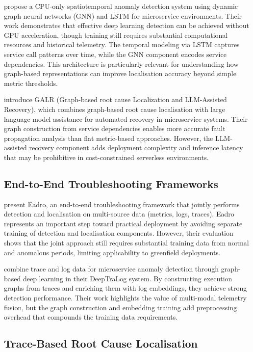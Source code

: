 \citet{zhang2026cpuonly} propose a CPU-only spatiotemporal anomaly detection system using dynamic graph neural networks (GNN) and LSTM for microservice environments. Their work demonstrates that effective deep learning detection can be achieved without GPU acceleration, though training still requires substantial computational resources and historical telemetry. The temporal modeling via LSTM captures service call patterns over time, while the GNN component encodes service dependencies. This architecture is particularly relevant for understanding how graph-based representations can improve localisation accuracy beyond simple metric thresholds.

\citet{zhang2026galr} introduce GALR (Graph-based root cause Localization and LLM-Assisted Recovery), which combines graph-based root cause localisation with large language model assistance for automated recovery in microservice systems. Their graph construction from service dependencies enables more accurate fault propagation analysis than flat metric-based approaches. However, the LLM-assisted recovery component adds deployment complexity and inference latency that may be prohibitive in cost-constrained serverless environments.

\subsection{End-to-End Troubleshooting Frameworks}

\citet{lee2023eadro} present Eadro, an end-to-end troubleshooting framework that jointly performs detection and localisation on multi-source data (metrics, logs, traces). Eadro represents an important step toward practical deployment by avoiding separate training of detection and localisation components. However, their evaluation shows that the joint approach still requires substantial training data from normal and anomalous periods, limiting applicability to greenfield deployments.

\citet{zhang2022deeptralog} combine trace and log data for microservice anomaly detection through graph-based deep learning in their DeepTraLog system. By constructing execution graphs from traces and enriching them with log embeddings, they achieve strong detection performance. Their work highlights the value of multi-modal telemetry fusion, but the graph construction and embedding training add preprocessing overhead that compounds the training data requirements.

\subsection{Trace-Based Root Cause Localisation}

